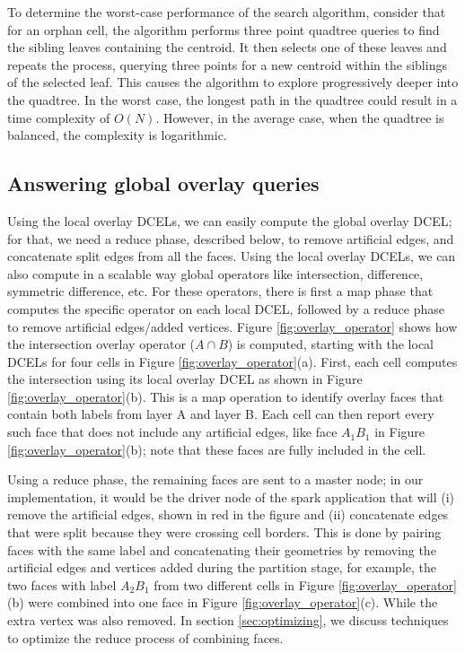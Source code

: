 To determine the worst-case performance of the search algorithm, consider that for an orphan cell, the algorithm performs three point quadtree queries to find the sibling leaves containing the centroid. It then selects one of these leaves and repeats the process, querying three points for a new centroid within the siblings of the selected leaf. This causes the algorithm to explore progressively deeper into the quadtree. In the worst case, the longest path in the quadtree could result in a time complexity of $O(N)$. However, in the average case, when the quadtree is balanced, the complexity is logarithmic.

\subsection{Answering global overlay queries} %
Using the local overlay DCELs, we can easily compute the global overlay DCEL; for that, we need a reduce phase, described below, to remove artificial edges, and 
concatenate split edges from all the faces. Using the local overlay DCELs, we can also compute in a scalable way global operators like intersection, difference, 
symmetric difference, etc. For these operators, there is first a map phase that computes the specific operator on each local DCEL, followed by a reduce phase to 
remove artificial edges/added vertices.
Figure \ref{fig:overlay_operator} shows how the intersection overlay operator ($A \cap B$) is computed, starting with the local DCELs for four cells in Figure 
\ref{fig:overlay_operator}(a). First, each cell computes the intersection using its local overlay DCEL as shown in Figure \ref{fig:overlay_operator}(b). This is 
a map operation to identify overlay faces that contain both labels from layer A and layer B. Each cell can then report every such face that does not include any 
artificial edges, like face $A_1B_1$ in Figure \ref{fig:overlay_operator}(b); note that these faces are fully included in the cell. 

Using a reduce phase, the remaining faces are sent to a master node; in our implementation, it would be the driver node of the spark application that will (i) remove the artificial edges, shown in red in the figure and (ii) concatenate edges that were split because they were crossing cell borders. This is done by pairing faces with the same label and concatenating their geometries by removing the artificial edges and vertices added during the partition stage, for example, the two faces with label $A_2B_1$ from two different cells in Figure \ref{fig:overlay_operator}(b) were combined into one face in Figure \ref{fig:overlay_operator}(c). While the extra vertex was also removed. In section \ref{sec:optimizing}, we discuss techniques to optimize the reduce process of combining faces.


